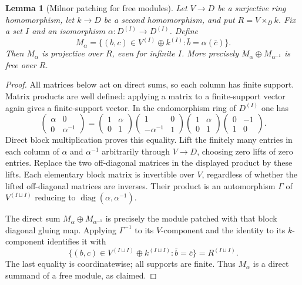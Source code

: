 \documentclass[11pt,a4paper]{article}
\newtheorem{lemma}[theorem]{Lemma}
\theoremstyle{definition}
\begin{document}
\begin{lemma}[Milnor patching for free modules]\label{result-28}
Let $V\to D$ be a surjective ring homomorphism, let $k\to D$ be a
second homomorphism, and put $R=V\times_D k$. Fix a set $I$ and an
isomorphism $\alpha:D^{(I)}\to D^{(I)}$. Define
\[
 M_\alpha=\{(b,c)\in V^{(I)}\oplus k^{(I)}:
                  \bar b=\alpha(\bar c)\}.
\]
Then $M_\alpha$ is projective over $R$, even for infinite $I$.
More precisely $M_\alpha\oplus M_{\alpha^{-1}}$ is free over $R$.
\end{lemma}
\begin{proof}
All matrices below act on direct sums, so each column has finite
support. Matrix products are well defined: applying a matrix to a
finite-support vector again gives a finite-support vector.
In the endomorphism ring of $D^{(I)}$ one has
\[
 \begin{pmatrix}\alpha&0\\0&\alpha^{-1}\end{pmatrix}
 =
 \begin{pmatrix}1&\alpha\\0&1\end{pmatrix}
 \begin{pmatrix}1&0\\-\alpha^{-1}&1\end{pmatrix}
 \begin{pmatrix}1&\alpha\\0&1\end{pmatrix}
 \begin{pmatrix}0&-1\\1&0\end{pmatrix}.
\]
Direct block multiplication proves this equality. Lift the finitely
many entries in each column of $\alpha$ and $\alpha^{-1}$ arbitrarily
through $V\to D$, choosing zero lifts of zero entries. Replace the
two off-diagonal matrices in the displayed product by these lifts.
Each elementary block matrix is invertible over $V$, regardless of
whether the lifted off-diagonal matrices are inverses. Their product
is an automorphism $\Gamma$ of $V^{(I\sqcup I)}$ reducing to
$\operatorname{diag}(\alpha,\alpha^{-1})$.

The direct sum $M_\alpha\oplus M_{\alpha^{-1}}$ is precisely the
module patched with that block diagonal gluing map. Applying
$\Gamma^{-1}$ to its $V$-component and the identity to its
$k$-component identifies it with
\[
 \{(b,c)\in V^{(I\sqcup I)}\oplus k^{(I\sqcup I)}:
                       \bar b=\bar c\}=R^{(I\sqcup I)}.
\]
The last equality is coordinatewise; all supports are finite.
Thus $M_\alpha$ is a direct summand of a free module, as claimed.
\end{proof}
\end{document}
